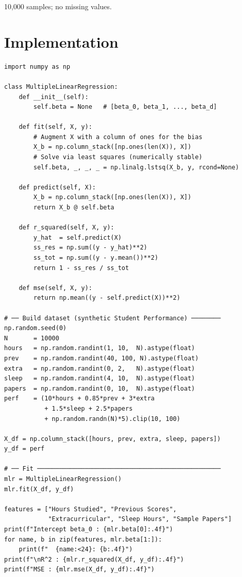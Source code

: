 \documentclass[12pt,a4paper]{article}
\begin{document}
10{,}000 samples; no missing values.

\section{Implementation}

\begin{lstlisting}[caption={MultipleLinearRegression — OLS normal equation}]
import numpy as np

class MultipleLinearRegression:
    def __init__(self):
        self.beta = None   # [beta_0, beta_1, ..., beta_d]

    def fit(self, X, y):
        # Augment X with a column of ones for the bias
        X_b = np.column_stack([np.ones(len(X)), X])
        # Solve via least squares (numerically stable)
        self.beta, _, _, _ = np.linalg.lstsq(X_b, y, rcond=None)

    def predict(self, X):
        X_b = np.column_stack([np.ones(len(X)), X])
        return X_b @ self.beta

    def r_squared(self, X, y):
        y_hat  = self.predict(X)
        ss_res = np.sum((y - y_hat)**2)
        ss_tot = np.sum((y - y.mean())**2)
        return 1 - ss_res / ss_tot

    def mse(self, X, y):
        return np.mean((y - self.predict(X))**2)

# ── Build dataset (synthetic Student Performance) ────────
np.random.seed(0)
N       = 10000
hours   = np.random.randint(1, 10,  N).astype(float)
prev    = np.random.randint(40, 100, N).astype(float)
extra   = np.random.randint(0, 2,   N).astype(float)
sleep   = np.random.randint(4, 10,  N).astype(float)
papers  = np.random.randint(0, 10,  N).astype(float)
perf    = (10*hours + 0.85*prev + 3*extra
           + 1.5*sleep + 2.5*papers
           + np.random.randn(N)*5).clip(10, 100)

X_df = np.column_stack([hours, prev, extra, sleep, papers])
y_df = perf

# ── Fit ──────────────────────────────────────────────────
mlr = MultipleLinearRegression()
mlr.fit(X_df, y_df)

features = ["Hours Studied", "Previous Scores",
            "Extracurricular", "Sleep Hours", "Sample Papers"]
print(f"Intercept beta_0 : {mlr.beta[0]:.4f}")
for name, b in zip(features, mlr.beta[1:]):
    print(f"  {name:<24}: {b:.4f}")
print(f"\nR^2 : {mlr.r_squared(X_df, y_df):.4f}")
print(f"MSE : {mlr.mse(X_df, y_df):.4f}")
\end{lstlisting}
\end{document}
